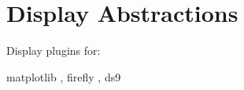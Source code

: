\section{Display Abstractions}

Display plugins for:

matplotlib \citep{2007CSE.....9...90H},
firefly \citep{2020ASPC..527..243R},
ds9 \citep{2003ASPC..295..489J}
